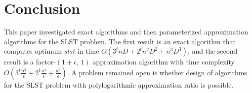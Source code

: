 \documentclass[english,runningheads,a4paper]{llncs}
\begin{document}
\section{Conclusion}

This paper investigated exact algorithms and then parameterized approximation
algorithms for the SLST problem. The first result is an exact algorithm
that computes optimum $slst$ in time $O(3^{t}nD+2^{t}n^{2}D^{2}+n^{3}D^{3})$,
and the second result is a factor-$(1+\epsilon,\,1)$ approximation
algorithm with time complexity $O(3^{t}\frac{n^{2}}{\epsilon}+2^{t}\frac{n^{4}}{\epsilon}+\frac{n^{6}}{\epsilon})$.
A problem remained open is whether design of algorithms for the SLST
problem with polylogarithmic approximation ratio is possible.



\end{document}
